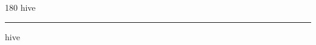 
\begin{frame}
\begin{center}
\begin{turn}{180}
{\fontsize{2.5cm}{1em}\selectfont hive}
\end{turn}
\vspace{1em}\par  
\hrule
\vspace{1em}\par  
{\fontsize{2.5cm}{1em}\selectfont hive}
\end{center}
\end{frame}
